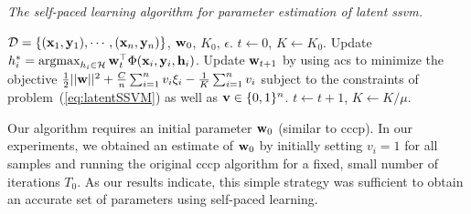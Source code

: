 \documentclass{article}
\newcommand{\mytopcaption}[1]{\caption{\em \footnotesize #1}}
\newcommand{\argmax}{\operatornamewithlimits{argmax}}
\begin{document}
\begin{algorithm}[h!]
\mytopcaption{The self-paced learning algorithm for parameter estimation of latent {\sc ssvm}.}
\label{algo:selfPacedLatentSSVM}
\begin{algorithmic}[1]
\INPUT ${\cal D} = \{({\bf x}_1,{\bf y}_1),\cdots,({\bf x}_n,{\bf y}_n)\}$, ${\bf w}_0$, $K_0$, $\epsilon$.
\STATE $t \leftarrow 0$, $K \leftarrow K_0$.
\REPEAT
\STATE Update $h_i^* = \argmax_{h_i \in {\cal H}} {\bf w}_{t}^\top \Phi({\bf x}_i,{\bf y}_i,{\bf h}_i)$.
\STATE Update ${\bf w}_{t+1}$ by using {\sc acs} to minimize the objective
$\frac{1}{2}||{\bf w}||^2 + \frac{C}{n} \sum_{i=1}^n v_i\xi_i - \frac{1}{K} \sum_{i=1}^n v_i$ subject to the
constraints of problem~(\ref{eq:latentSSVM}) as
well as ${\bf v} \in \{0,1\}^n$.
\STATE $t \leftarrow t + 1$, $K \leftarrow K/\mu$.
\end{algorithmic}
\end{algorithm}


Our algorithm requires an initial parameter ${\bf w}_0$ (similar to {\sc cccp}). 
In our experiments, we obtained an estimate of ${\bf w}_0$ by
initially setting $v_i = 1$ for all samples and running the original
{\sc cccp} algorithm for a fixed, small number of iterations $T_0$. 
As our results indicate, this simple strategy was sufficient to obtain
an accurate set of parameters using self-paced learning. 
\end{document}
